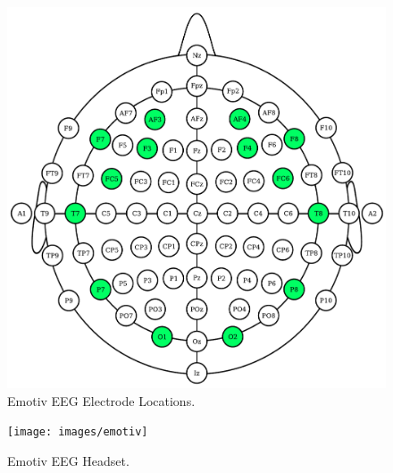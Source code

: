 \documentclass[12pt]{article}
\numberwithin{equation}{section}
\numberwithin{figure}{section}
\numberwithin{table}{section}
\begin{document}
\begin{figure}[ht]
    \centering
    \includegraphics[scale=0.6]{images/10_20_emotiv}
    \caption{Emotiv EEG Electrode Locations.}
    \label{fig:emotiv_eeg_1020}
\end{figure}

\begin{figure}[ht]
    \centering
    \texttt{[image: images/emotiv]}
    \caption{Emotiv EEG Headset.}
    \label{fig:emotiv_eeg_headset}
\end{figure}
\end{document}
